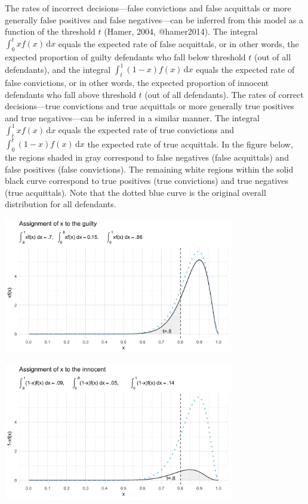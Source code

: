 \documentclass[10pt,dvipsnames]{scrartcl}
\begin{document}
The rates of incorrect decisions---false convictions and false
acquittals or more generally false positives and false negatives---can
be inferred from this model as a function of the threshold \(t\) (Hamer,
2004, @hamer2014). The integral \(\int_0^t \! xf(x) \, \mathrm{d}x\)
equals the expected rate of false acquittals, or in other words, the
expected proportion of guilty defendants who fall below threshold \(t\)
(out of all defendants), and the integral
\(\int_t^1 \! (1-x)f(x) \, \mathrm{d}x\) equals the expected rate of
false convictions, or in other words, the expected proportion of
innocent defendants who fall above threshold \(t\) (out of all
defendants). The rates of correct decisions---true convictions and true
acquittals or more generally true positives and true negatives---can be
inferred in a similar manner. The integral
\(\int_t^1 \! xf(x) \, \mathrm{d}x\) equals the expected rate of true
convictions and \(\int_0^t \! (1-x)f(x) \, \mathrm{d}x\) the expected
rate of true acquittals. In the figure below, the regions shaded in gray
correspond to false negatives (false acquittals) and false positives
(false convictions). The remaining white regions within the solid black
curve correspond to true positives (true convictions) and true negatives
(true acquittals). Note that the dotted blue curve is the original
overall distribution for all defendants.

\begin{center}
    \includegraphics[width=10cm]{xfx3.png}
\end{center}

\begin{center}
    \includegraphics[width=10cm]{nxfx3.png}
\end{center}
\end{document}
